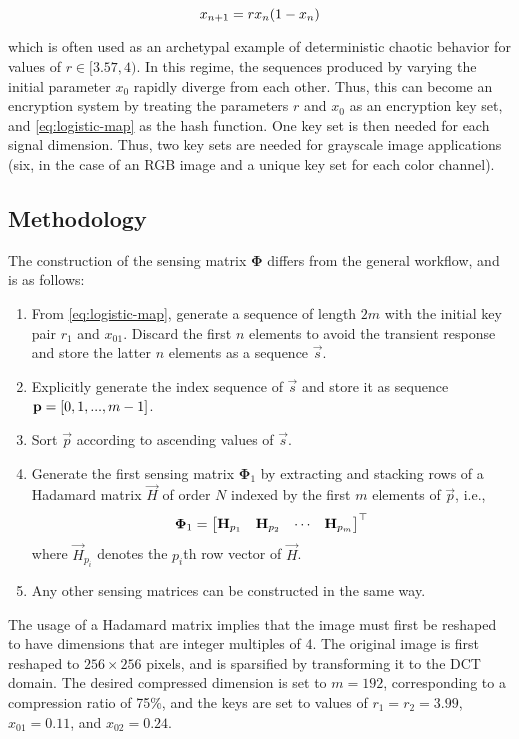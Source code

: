 \begin{equation}\label{eq:logistic-map}
x_{n+1} = r x_n \qty(1 - x_n)
\end{equation}

\noindent which is often used as an archetypal example of deterministic chaotic behavior for values of $r \in [3.57, 4)$. In this regime, the sequences produced by varying the initial parameter $x_0$ rapidly diverge from each other. Thus, this can become an encryption system by treating the parameters $r$ and $x_0$ as an encryption key set, and \eqref{eq:logistic-map} as the hash function. One key set is then needed for each signal dimension. Thus, two key sets are needed for grayscale image applications (six, in the case of an RGB image and a unique key set for each color channel). 

\subsection{Methodology}
\label{ssec:image-encrypt-metho}
The construction of the sensing matrix $\bm\Phi$ differs from the general workflow, and is as follows:

\begin{enumerate}
	\item From \eqref{eq:logistic-map}, generate a sequence of length $2m$ with the initial key pair $r_1$ and $x_{01}$. Discard the first $n$ elements to avoid the transient response and store the latter $n$ elements as a sequence $\vec{s}$.
	\item Explicitly generate the index sequence of $\vec{s}$ and store it as sequence $\text{\bfseries p} = \qty[0, 1, ..., m-1]$.
	\item Sort $\vec{p}$ according to ascending values of $\vec{s}$.
	\item Generate the first sensing matrix $\bm\Phi_1$ by extracting and stacking rows of a Hadamard matrix $\vec{H}$ of order $N$ indexed by the first $m$ elements of $\vec{p}$, i.e.,
	\begin{equation}\label{eq:construct-hadamard}
	\bm\Phi_1 = \mqty[
	\vec{H}_{p_1} & \vec{H}_{p_2} & \cdots & \vec{H}_{p_m}
	]^\top
	\end{equation}
	\noindent where $\vec{H}_{p_i}$ denotes the $p_i$th row vector of $\vec{H}$.
	\item Any other sensing matrices can be constructed in the same way.
\end{enumerate}

The usage of a Hadamard matrix implies that the image must first be reshaped to have dimensions that are integer multiples of 4. The original image is first reshaped to $256 \times 256$ pixels, and is sparsified by transforming it to the DCT domain. The desired compressed dimension is set to $m = 192$, corresponding to a compression ratio of 75\%, and the keys are set to values of $r_1 = r_2 = 3.99$, $x_{01} = 0.11$, and $x_{02} = 0.24$.


